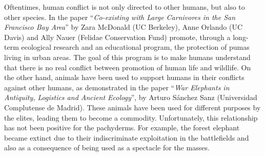 
Oftentimes,  human conflict is not only directed to other humans, but also to other species. In the paper “\textit{Co-existing with Large Carnivores in the San Francisco Bay Area}” by Zara McDonald (UC Berkeley), Anne Orlando (UC Davis) and Ally Nauer (Felidae Conservation Fund) promote, through a long-term ecological research and an educational program, the protection of pumas living in urban areas. The goal of this program is to make humans understand that there is no real conflict between promotion of human life and wildlife. On the other hand, animals have been used to support humans in their conflicts against other humans, as demonstrated in the paper “\textit{War Elephants in Antiquity, Logistics and Ancient Ecology}”, by Arturo Sánchez Sanz (Universidad Complutense de Madrid). These animals have been used for different purposes by the elites, leading them to become a commodity. Unfortunately, this relationship has not been positive for the pachyderms. For example, the forest elephant became extinct due to their indiscriminate exploitation in the battlefields and also as a consequence of being used as a spectacle for the masses. 


